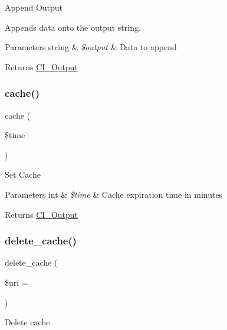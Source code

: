 Append Output

Appends data onto the output string.


\begin{DoxyParams}[1]{Parameters}
string & {\em \$output} & Data to append \\
\hline
\end{DoxyParams}
\begin{DoxyReturn}{Returns}
\mbox{\hyperlink{class_c_i___output}{C\+I\+\_\+\+Output}} 
\end{DoxyReturn}
\mbox{\label{class_c_i___output_a6eae3cd828cf30926d44f1ab6011f939}} 
\subsubsection{\texorpdfstring{cache()}{cache()}}
{\footnotesize\ttfamily cache (\begin{DoxyParamCaption}\item[{}]{\$time }\end{DoxyParamCaption})}

Set Cache


\begin{DoxyParams}[1]{Parameters}
int & {\em \$time} & Cache expiration time in minutes \\
\hline
\end{DoxyParams}
\begin{DoxyReturn}{Returns}
\mbox{\hyperlink{class_c_i___output}{C\+I\+\_\+\+Output}} 
\end{DoxyReturn}
\mbox{\label{class_c_i___output_a475c83a7e4d2f7162032c01279c161b4}} 
\subsubsection{\texorpdfstring{delete\+\_\+cache()}{delete\_cache()}}
{\footnotesize\ttfamily delete\+\_\+cache (\begin{DoxyParamCaption}\item[{}]{\$uri = {\ttfamily \textquotesingle{}\textquotesingle{}} }\end{DoxyParamCaption})}

Delete cache


